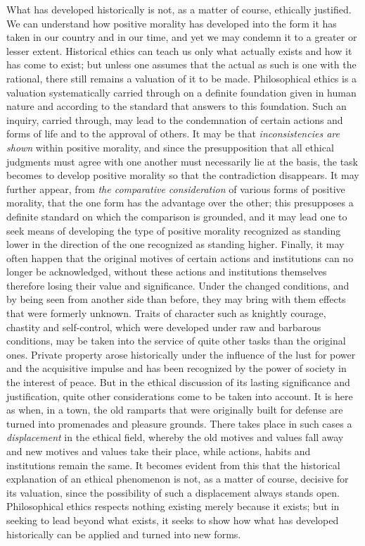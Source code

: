 \documentclass[12pt,a4paper,openany]{book}
\newcommand{\opage}[1]{\marginnote{\footnotesize\textit{[#1]}}}
\begin{document}
What has developed historically is not, as a matter of course, ethically justified. We can
understand how positive morality has developed
\opage{10}into the form it has taken in our country and in our time, and yet we may condemn it to a
greater or lesser extent. Historical ethics can teach us only what actually exists and how it has
come to exist; but unless one assumes that the actual as such is one with the rational, there still
remains a valuation of it to be made. Philosophical ethics is a valuation systematically carried
through on a definite foundation given in human nature and according to the standard that answers
to this foundation. Such an inquiry, carried through, may lead to the condemnation of certain
actions and forms of life and to the approval of others. It may be that \textit{inconsistencies are
shown} within positive morality, and since the presupposition that all ethical judgments must agree
with one another must necessarily lie at the basis, the task becomes to develop positive morality
so that the contradiction disappears. It may further appear, from \textit{the comparative
consideration} of various forms of positive morality, that the one form has the advantage over the
other; this presupposes a definite standard on which the comparison is grounded, and it may lead
one to seek means of developing the type of positive morality recognized as standing lower in the
direction of the one recognized as standing higher. Finally, it may often happen that the original
motives of certain actions and institutions can no longer be acknowledged, without these actions
and institutions themselves therefore losing their value and significance. Under the changed
conditions, and by being seen from another side than before, they may bring with them effects that
were formerly unknown. Traits of character such as knightly courage, chastity and self-control,
which were developed under raw and barbarous conditions, may be taken into the service of quite
other tasks than the original ones. Private property arose historically under the influence of the
lust for power and the acquisitive impulse and has been recognized by the power of society in the
interest of peace. But in the ethical discussion of its lasting significance and justification,
quite other considerations come to be taken into account. It is here as when, in a town, the old
ramparts that were originally built for defense are turned into promenades and pleasure grounds.
There takes
\opage{11}place in such cases a \textit{displacement} in the ethical field, whereby the old motives and
values fall away and new motives and values take their place, while actions, habits and
institutions remain the same. It becomes evident from this that the historical explanation of an
ethical phenomenon is not, as a matter of course, decisive for its valuation, since the possibility
of such a displacement always stands open. Philosophical ethics respects nothing existing merely
because it exists; but in seeking to lead beyond what exists, it seeks to show how what has
developed historically can be applied and turned into new forms.
\end{document}
